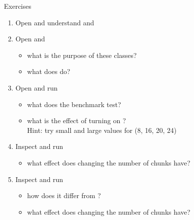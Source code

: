 \documentclass[aspectratio=43]{beamer}
\begin{document}
\begin{frame}[fragile]{Exercises}
    \begin{enumerate}
        \item Open  and understand  and 

        \item Open  and 
        \begin{itemize}
            \item what is the purpose of these classes?
            \item what does  do?
        \end{itemize}

        \item Open  and run
        \begin{itemize}
            \item what does the benchmark test?
            \item what is the effect of turning on ?\\Hint: try small and large values for  (8, 16, 20, 24)
        \end{itemize}

        \item Inspect  and run
        \begin{itemize}
            \item what effect does changing the number of chunks have?
        \end{itemize}

        \item Inspect  and run
        \begin{itemize}
            \item how does it differ from ?
            \item what effect does changing the number of chunks have?
        \end{itemize}
    \end{enumerate}
\end{frame}


\end{document}
